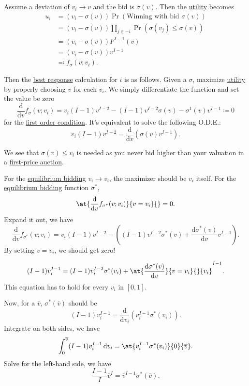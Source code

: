 Assume a deviation of \(v_{i}\to v\) and the bid is \(\sigma(v)\). Then the \hyperref[def:reward]{utility}  becomes
\[
	\begin{split}
		u_{i} &= (v_{i} - \sigma(v))\Pr( \text{Winning with bid } \sigma(v))\\
		&= (v_{i} - \sigma(v))\prod\limits_{j\in -i}\Pr(\sigma(v_{j})\leq \sigma(v))\\
		&= (v_{i} - \sigma(v))F^{I-1}(v)\\
		&= (v_{i} - \sigma(v))v^{I-1}\\
		&\eqqcolon f_{\sigma}(v; v_{i}).
	\end{split}
\]

Then the \hyperref[def:best-response]{best response} calculation for \(i\) is as follows. Given a \(\sigma\), maximize \hyperref[def:reward]{utility} by properly choosing \(v\) for each \(v_{i}\). We simply differentiate the function and set the value be zero
\[
	\frac{\mathrm{d}}{\mathrm{d}v}f_{\sigma}(v;v_{i}) = v_{i}(I - 1)v^{I-2} - (I - 1)v^{I-2}\sigma(v) - \sigma^1(v)v^{I-1} \coloneqq 0
\]
for the \underline{first order condition}. It's equivalent to solve the following O.D.E.:
\[
	v_{i}(I - 1)v^{I-2} = \frac{\mathrm{d}}{\mathrm{d}v} (\sigma(v)v^{I-1}).
\]

We see that \(\sigma(v)\leq v_{i}\) is needed as you never bid higher than your valuation in a \hyperref[eg:first-price-auction]{first-price auction}.

For the \hyperref[rmk:equilibrium-bidding]{equilibrium bidding} \(v_{i}\to v_{i}\), the maximizer should be \(v_{i}\) itself. For the \hyperref[rmk:equilibrium-bidding]{equilibrium bidding} function \(\sigma^{\ast}\),
\[
	\at{\frac{\mathrm{d}}{\mathrm{d}v} f_{\sigma^{\ast}}(v;v_{i})}{v = v_{i}}{} = 0.
\]
Expand it out, we have
\[
	\frac{\mathrm{d}}{\mathrm{d}v} f_{\sigma^{\ast}}(v;v_{i}) = v_{i}(I - 1)v^{I-2} - \left((I - 1)v^{I-2}\sigma^{\ast}(v) + \frac{\mathrm{d}\sigma^{\ast}(v)}{\mathrm{d}v} v^{I-1}\right).
\]
By setting \(v = v_{i}\), we should get zero!

\[
	(I - 1)v_{i}^{I-1} = (I - 1)v_{i}^{I-2}\sigma^{\ast}(v_{i})+\at{\frac{\mathrm{d}\sigma^{\ast}(v)}{\mathrm{d}v}}{v = v_{i}}{}{v_{i}}^{I-1}.
\]
This equation has to hold for every \(v_{i}\) in \([0, 1]\).

Now, for a \(\overline{v}\), \(\sigma^{\ast}(\overline{v})\) should be
\[
	(I - 1)v_{i}^{I-1} = \frac{\mathrm{d}}{\mathrm{d}v_{i}} \left(v_{i}^{I-1}\sigma^{\ast}(v_{i})\right).
\]
Integrate on both sides, we have
\[
	\int_0^{\overline{v}}(I - 1)v_{i}^{I-1}\,\mathrm{d} v_{i} = \at{v_{i}^{I-1}\sigma^{\ast}(v_{i})}{0}{\overline{v}}.
\]
Solve for the left-hand side, we have
\[
	\frac{I - 1}{I}\overline{v}^I = \overline{v}^{I-1}\sigma^{\ast}(\overline{v}).
\]

